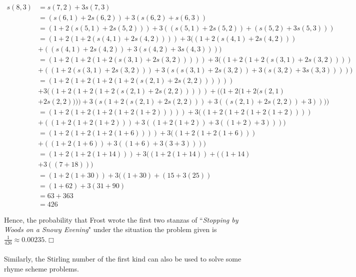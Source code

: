 \documentclass{article}
\theoremstyle{definition}
\theoremstyle{remark}
\theoremstyle{example}
\newcommand{\qedwhite}{\hfill \ensuremath{\Box}}
\begin{document}
\begin{align}
    s(8,3) &= s(7,2) + 3s(7,3)\\
    & = (s(6,1) + 2s(6,2)) + 3(s(6,2) + s(6,3))\\
    & = (1 + 2(s(5,1) + 2s(5,2))) + 3((s(5,1) + 2s(5,2)) + (s(5,2) + 3s(5,3)))\\
    & = (1 + 2(1 + 2(s(4,1) + 2s(4,2)))) + 3((1 + 2(s(4,1) + 2s(4,2))) \\
    & + ((s(4,1) + 2s(4,2)) + 3(s(4,2) + 3s(4,3))))\\
    & = (1 + 2(1 + 2(1 + 2(s(3,1) + 2s(3,2))))) + 3((1 + 2(1 + 2(s(3,1) + 2s(3,2)))) \\
    & + ((1 + 2(s(3,1) + 2s(3,2))) + 3(s(s(3,1) + 2s(3,2)) + 3(s(3,2) + 3s(3,3)))))\\
    & = (1 + 2(1 + 2(1 + 2(1 + 2(s(2,1) + 2s(2,2)))))) \\
    & + 3((1 + 2(1 + 2(1 + 2(s(2,1) + 2s(2,2))))) + ((1 + 2(1 + 2(s(2,1) \\
    &+ 2s(2,2)))) + 3(s(1 + 2(s(2,1) + 2s(2,2))) + 3((s(2,1) + 2s(2,2)) + 3))))\\
    & = (1 + 2(1 + 2(1 + 2(1 + 2(1 + 2))))) + 3((1 + 2(1 + 2(1 + 2(1 + 2)))) \\
    & + ((1 + 2(1 + 2(1 + 2))) + 3((1 + 2(1 + 2)) + 3((1 + 2) + 3))))\\
    & = (1 + 2(1 + 2(1 + 2(1 + 6)))) + 3((1 + 2(1 + 2(1 + 6))) \\
    & + ((1 + 2(1 + 6)) + 3((1 + 6) + 3(3 + 3))))\\
    & = (1 + 2(1 + 2(1 + 14))) + 3((1 + 2(1 + 14)) + ((1 + 14) \\
    & + 3((7 + 18)))\\
    & = (1 + 2(1 + 30)) + 3((1 + 30) + (15 + 3(25))\\
    & = (1 + 62) + 3(31 + 90)\\
    & = 63 + 363\\
    & = 426
\end{align}

Hence, the probability that Frost wrote the first two stanzas of ``\textit{Stopping by Woods on a Snowy Evening}" under the situation the problem given is $\tfrac{1}{426} \approx 0.00235$.\qedwhite

\paragraph{  }

Similarly, the Stirling number of the first kind can also be used to solve some rhyme scheme problems.
\end{document}
